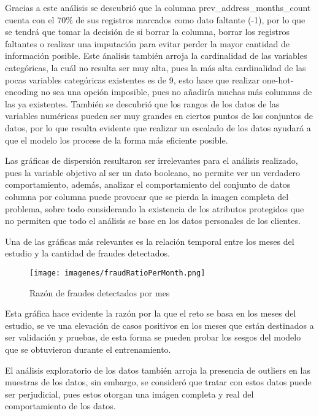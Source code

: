 \documentclass[runningheads]{llncs}
\begin{document}
Gracias a este análisis se descubrió que la columna prev\_address\_months\_count cuenta con el 70\% de sus registros marcados como dato faltante (-1), por lo que se tendrá que tomar la decisión de si borrar la columna, borrar los registros faltantes o realizar una imputación para evitar perder la mayor cantidad de información posible.
Este ánalisis también arroja la cardinalidad de las variables categóricas, la cuál no resulta ser muy alta, pues la más alta cardinalidad de las pocas variables categóricas existentes es de 9, esto hace que realizar one-hot-encoding no sea una opción imposible, pues no añadiría muchas más columnas de las ya existentes.
También se descubrió que los rangos de los datos de las variables numéricas pueden ser muy grandes en ciertos puntos de los conjuntos de datos, por lo que resulta evidente que realizar un escalado de los datos ayudará a que el modelo los procese de la forma más eficiente posible.

Las gráficas de dispersión resultaron ser irrelevantes para el análisis realizado, pues la variable objetivo al ser un dato booleano, no permite ver un verdadero comportamiento, además, analizar el comportamiento del conjunto de datos columna por columna puede provocar que se pierda la imagen completa del problema, sobre todo considerando la existencia de los atributos protegidos que no permiten que todo el análisis se base en los datos personales de los clientes.

Una de las gráficas más relevantes es la relación temporal entre los meses del estudio y la cantidad de fraudes detectados.

\begin{figure}[H] %
\centering
\texttt{[image: imagenes/fraudRatioPerMonth.png]}
\caption{Razón de fraudes detectados por mes}
\label{fig:ejemplo}
\end{figure}
Esta gráfica hace evidente la razón por la que el reto se basa en los meses del estudio, se ve una elevación de casos positivos en los meses que están destinados a ser validación y pruebas, de esta forma se pueden probar los sesgos del modelo que se obtuvieron durante el entrenamiento.

El análisis exploratorio de los datos también arroja la presencia de outliers en las muestras de los datos, sin embargo, se consideró que tratar con estos datos puede ser perjudicial, pues estos otorgan una imágen completa y real del comportamiento de los datos.
\end{document}
